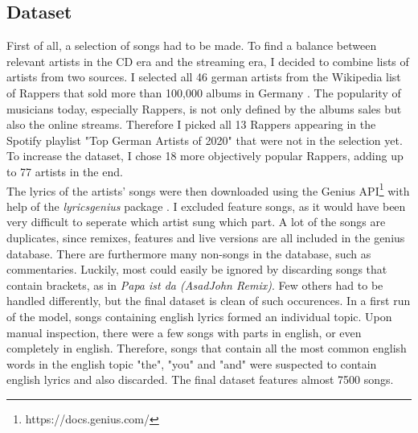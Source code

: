 \documentclass[conference]{IEEEtran}
\begin{document}
\subsection{Dataset}
First of all, a selection of songs had to be made. To find a balance between relevant artists in the CD era and the streaming era, I decided to combine lists of artists from two sources. I selected all 46 german artists from the Wikipedia list of Rappers that sold more than 100,000 albums in Germany \cite{wiki_albums}. The popularity of musicians today, especially Rappers, is not only defined by the albums sales but also the online streams. Therefore I picked all 13 Rappers appearing in the Spotify playlist "Top German Artists of 2020" \cite{spotify_2020} that were not in the selection yet. To increase the dataset, I chose 18 more objectively popular Rappers, adding up to 77 artists in the end.\\
The lyrics of the artists' songs were then downloaded using the Genius API\footnote{https://docs.genius.com/} with help of the \textit{lyricsgenius} package \cite{lyricsgenius}. I excluded feature songs, as it would have been very difficult to seperate which artist sung which part. A lot of the songs are duplicates, since remixes, features and live versions are all included in the genius database. There are furthermore many non-songs in the database, such as commentaries. Luckily, most could easily be ignored by discarding songs that contain brackets, as in \textit{Papa ist da (AsadJohn Remix)}. Few others had to be handled differently, but the final dataset is clean of such occurences. In a first run of the model, songs containing english lyrics formed an individual topic. Upon manual inspection, there were a few songs with parts in english, or even completely in english. Therefore, songs that contain all the most common english words in the english topic "the", "you" and "and" were suspected to contain english lyrics and also discarded. The final dataset features almost 7500 songs.
\end{document}
